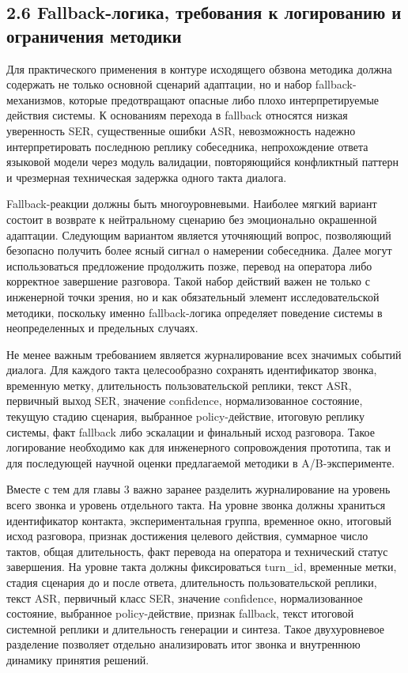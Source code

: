\documentclass[a4paper,14pt]{extarticle}
\renewcommand{\texttt}[1]{\textnormal{#1}}
\begin{document}
\subsection{2.6 Fallback-логика, требования к логированию и ограничения
методики}\label{fallback-ux43bux43eux433ux438ux43aux430-ux442ux440ux435ux431ux43eux432ux430ux43dux438ux44f-ux43a-ux43bux43eux433ux438ux440ux43eux432ux430ux43dux438ux44e-ux438-ux43eux433ux440ux430ux43dux438ux447ux435ux43dux438ux44f-ux43cux435ux442ux43eux434ux438ux43aux438}

Для практического применения в контуре исходящего обзвона методика
должна содержать не только основной сценарий адаптации, но и набор
fallback-механизмов, которые предотвращают опасные либо плохо
интерпретируемые действия системы. К основаниям перехода в fallback
относятся низкая уверенность \texttt{SER}, существенные ошибки
\texttt{ASR}, невозможность надежно интерпретировать последнюю реплику
собеседника, непрохождение ответа языковой модели через модуль
валидации, повторяющийся конфликтный паттерн и чрезмерная техническая
задержка одного такта диалога.

Fallback-реакции должны быть многоуровневыми. Наиболее мягкий вариант
состоит в возврате к нейтральному сценарию без эмоционально окрашенной
адаптации. Следующим вариантом является уточняющий вопрос, позволяющий
безопасно получить более ясный сигнал о намерении собеседника. Далее
могут использоваться предложение продолжить позже, перевод на оператора
либо корректное завершение разговора. Такой набор действий важен не
только с инженерной точки зрения, но и как обязательный элемент
исследовательской методики, поскольку именно fallback-логика определяет
поведение системы в неопределенных и предельных случаях.

Не менее важным требованием является журналирование всех значимых
событий диалога. Для каждого такта целесообразно сохранять идентификатор
звонка, временную метку, длительность пользовательской реплики, текст
\texttt{ASR}, первичный выход \texttt{SER}, значение
\texttt{confidence}, нормализованное состояние, текущую стадию сценария,
выбранное policy-действие, итоговую реплику системы, факт fallback либо
эскалации и финальный исход разговора. Такое логирование необходимо как
для инженерного сопровождения прототипа, так и для последующей научной
оценки предлагаемой методики в A/B-эксперименте.

Вместе с тем для главы 3 важно заранее разделить журналирование на
уровень всего звонка и уровень отдельного такта. На уровне звонка должны
храниться идентификатор контакта, экспериментальная группа, временное
окно, итоговый исход разговора, признак достижения целевого действия,
суммарное число тактов, общая длительность, факт перевода на оператора и
технический статус завершения. На уровне такта должны фиксироваться
\texttt{turn\_id}, временные метки, стадия сценария до и после ответа,
длительность пользовательской реплики, текст \texttt{ASR}, первичный
класс \texttt{SER}, значение \texttt{confidence}, нормализованное
состояние, выбранное \texttt{policy}-действие, признак
\texttt{fallback}, текст итоговой системной реплики и длительность
генерации и синтеза. Такое двухуровневое разделение позволяет отдельно
анализировать итог звонка и внутреннюю динамику принятия решений.
\end{document}
